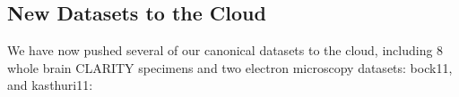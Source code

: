 \documentclass[simplex.tex]{subfiles}
\begin{document}
\subsection{New Datasets to the Cloud}
We have now pushed several of our canonical datasets to the cloud,
including 8 whole brain CLARITY specimens and two electron microscopy
datasets: bock11, and kasthuri11:\\
%
\end{document}
